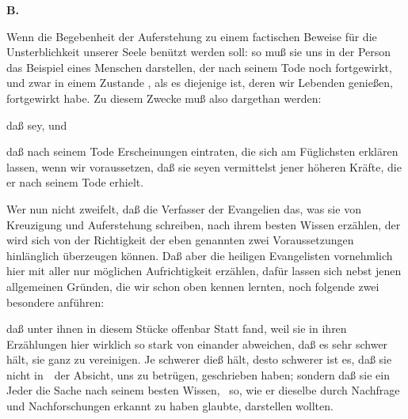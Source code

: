 \vabst\textbf{B.}~
\begin{aufza}
\item Wenn die Begebenheit der Auferstehung  zu einem factischen Beweise für die Unsterblichkeit unserer Seele benützt werden soll: so muß sie uns in der Person  das Beispiel eines Menschen darstellen, der nach seinem Tode noch  fortgewirkt, und zwar in einem Zustande , als es diejenige ist, deren wir Lebenden genießen, fortgewirkt habe. Zu diesem Zwecke muß also dargethan werden:
\begin{aufzb}
\item daß  sey, und
\item daß nach seinem Tode Erscheinungen eintraten, die sich am Füglichsten erklären lassen, wenn wir voraussetzen, daß sie  seyen vermittelst jener höheren Kräfte, die er nach seinem Tode erhielt.
\end{aufzb}
\item Wer nun nicht zweifelt, daß die Verfasser der Evangelien das, was sie von  Kreuzigung und Auferstehung schreiben, nach ihrem besten Wissen erzählen, der wird sich von der Richtigkeit der eben genannten zwei Voraussetzungen hinlänglich überzeugen können. Daß aber die heiligen Evangelisten vornehmlich hier mit aller nur möglichen Aufrichtigkeit erzählen, dafür lassen sich nebst jenen allgemeinen Gründen, die wir schon oben kennen lernten, noch folgende zwei besondere anführen:
\begin{aufzb}
\item daß unter ihnen in diesem Stücke offenbar  Statt fand, weil sie in ihren Erzählungen hier wirklich so stark von einander abweichen, daß es sehr schwer hält, sie ganz zu vereinigen. Je schwerer dieß hält, desto schwerer ist es, daß sie nicht in~\ der Absicht, uns zu betrügen, geschrieben haben; sondern daß sie ein Jeder die Sache nach seinem besten Wissen, \dh\ so, wie er dieselbe durch Nachfrage und Nachforschungen erkannt zu haben glaubte, darstellen wollten.

\end{aufzb}
\end{aufza}
